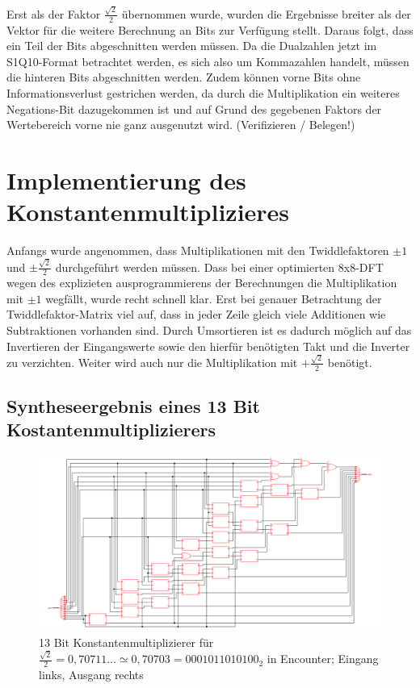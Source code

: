 Erst als der Faktor $\frac{\sqrt{2}}{2}$ übernommen wurde, wurden die Ergebnisse breiter als der Vektor für die weitere Berechnung an Bits zur Verfügung stellt.
Daraus folgt, dass ein Teil der Bits abgeschnitten werden müssen. Da die Dualzahlen jetzt im S1Q10-Format betrachtet werden, es sich also um Kommazahlen handelt,
müssen die hinteren Bits abgeschnitten werden. Zudem können vorne Bits ohne Informationsverlust gestrichen werden, da durch die Multiplikation ein weiteres 
Negations-Bit dazugekommen ist und auf Grund des gegebenen Faktors der Wertebereich vorne nie ganz ausgenutzt wird. (Verifizieren / Belegen!)


\section{Implementierung des Konstantenmultiplizieres}\label{sec:Konstantenmultiplizierer}

Anfangs wurde angenommen, dass Multiplikationen mit den Twiddlefaktoren $\pm 1$ und $\pm\frac{\sqrt{2}}{2}$ durchgeführt werden müssen. 
Dass bei einer optimierten 8x8-DFT wegen des explizieten ausprogrammierens der Berechnungen die Multiplikation mit $\pm1$ wegfällt, wurde recht schnell klar.
Erst bei genauer Betrachtung der Twiddlefaktor-Matrix viel auf, dass in jeder Zeile gleich viele Additionen wie Subtraktionen vorhanden sind. Durch Umsortieren 
ist es dadurch möglich auf das Invertieren der Eingangswerte sowie den hierfür benötigten Takt und die Inverter zu verzichten. Weiter wird auch nur die Multiplikation
mit $+\frac{\sqrt{2}}{2}$ benötigt.

\subsection{Syntheseergebnis eines 13 Bit Kostantenmultiplizierers}
\begin{figure}[!ht]
\centering  
  \includegraphics[width=1\textwidth]{img/13Bit_Konstantenmultiplizierer_Netlist.png}
  \caption{13 Bit Konstantenmultiplizierer für $\frac{\sqrt{2}}{2} = 0,70711... \simeq 0,70703 = 0001011010100_2$ in Encounter; Eingang links, Ausgang rechts}
\end{figure}



